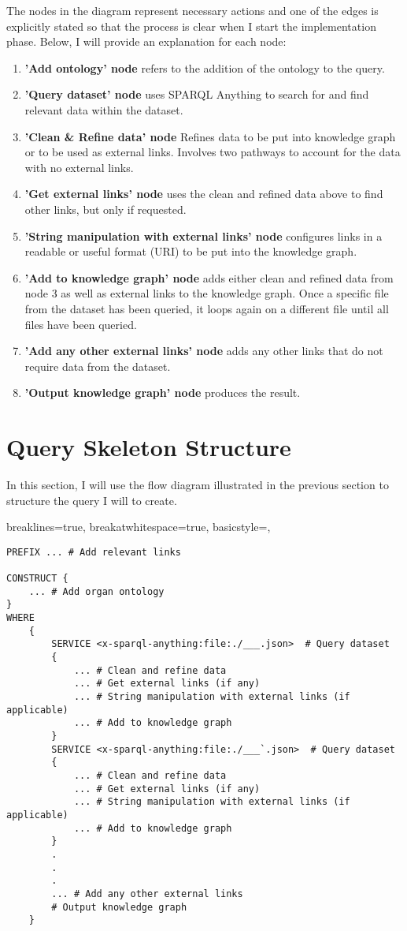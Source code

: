 The nodes in the diagram represent necessary actions and one of the edges is explicitly stated so that the process is clear when I start the implementation phase. Below, I will provide an explanation for each node: 

\begin{enumerate}
  \item \textbf{'Add ontology' node} refers to the addition of the ontology to the query.
  \item \textbf{'Query dataset' node} uses SPARQL Anything to search for and find relevant data within the dataset.
  \item \textbf{'Clean \& Refine data' node} Refines data to be put into knowledge graph or to be used as external links. Involves two pathways to account for the data with no external links.
  \item \textbf{'Get external links' node} uses the clean and refined data above to find other links, but only if requested.
  \item \textbf{'String manipulation with external links' node} configures links in a readable or useful format (URI) to be put into the knowledge graph.
  \item \textbf{'Add to knowledge graph' node} adds either clean and refined data from node 3 as well as external links to the knowledge graph. Once a specific file from the dataset has been queried, it loops again on a different file until all files have been queried.
  \item \textbf{'Add any other external links' node} adds any other links that do not require data from the dataset.
  \item \textbf{'Output knowledge graph' node} produces the result.
\end{enumerate}

\section{Query Skeleton Structure}
\hspace{0.5cm} In this section, I will use the flow diagram illustrated in the previous section to structure the query I will to create.

\lstset
{
    breaklines=true,
    breakatwhitespace=true,
    basicstyle=\ttfamily,
}
\begin{lstlisting}
PREFIX ... # Add relevant links

CONSTRUCT {
    ... # Add organ ontology
} 
WHERE 
    { 
        SERVICE <x-sparql-anything:file:./___.json>  # Query dataset
        { 
            ... # Clean and refine data
            ... # Get external links (if any)
            ... # String manipulation with external links (if applicable)
            ... # Add to knowledge graph
        } 
        SERVICE <x-sparql-anything:file:./___`.json>  # Query dataset
        { 
            ... # Clean and refine data
            ... # Get external links (if any)
            ... # String manipulation with external links (if applicable)
            ... # Add to knowledge graph
        } 
        .
        .
        .
        ... # Add any other external links 
        # Output knowledge graph
    }

\end{lstlisting}

